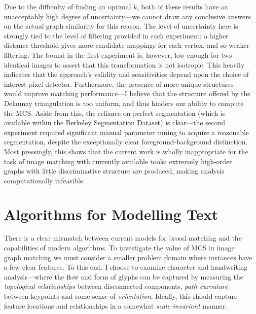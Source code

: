 \documentclass{mpaper}
\begin{document}
\noindent Due to the difficulty of finding an optimal $k$, both of these results have an unacceptably high degree of uncertainty---we cannot draw any conclusive answers on the actual graph similarity for this reason.
The level of uncertainty here is strongly tied to the level of filtering provided in each experiment: a higher distance threshold gives more candidate mappings for each vertex, and so weaker filtering.
The bound in the first experiment is, however, low enough for two identical images to assert that this transformation is not isotropic.
This heavily indicates that the approach's validity and sensitivities depend upon the choice of interest pixel detector.
Furthermore, the presence of more unique structures would improve matching performance---I believe that the structure offered by the Delaunay triangulation is too uniform, and thus hinders our ability to compute the MCS.
Aside from this, the reliance on perfect segmentation (which is available within the Berkeley Segmentation Dataset) is clear---the second experiment required significant manual parameter tuning to acquire a reasonable segmentation, despite the exceptionally clear foreground-background distinction.
Most pressingly, this shows that the current work is wholly inappropriate for the task of image matching with currently available tools: extremely high-order graphs with little discriminative structure are produced, making analysis computationally infeasible.

\section{Algorithms for Modelling Text}
\label{sec:algorithm}

There is a clear mismatch between current models for broad matching and the capabilities of modern algorithms.
To investigate the value of MCS in image graph matching we must consider a smaller problem domain where instances have a few clear features.
To this end, I choose to examine character and handwriting analysis---where the flow and form of glyphs can be captured by measuring the \emph{topological relationships} between disconnected components, \emph{path curvature} between keypoints and some sense of \emph{orientation}.
Ideally, this should capture feature locations and relationships in a somewhat \emph{scale-invariant} manner.
\end{document}
